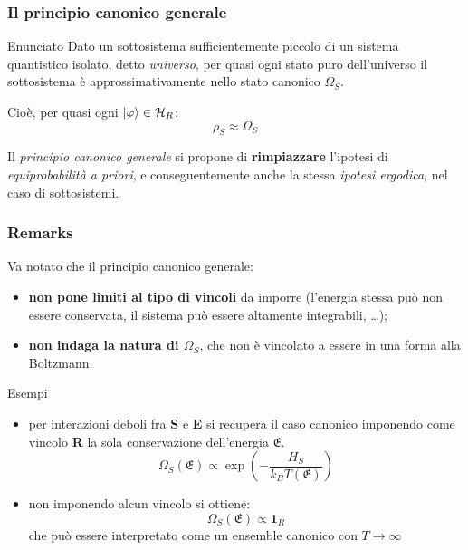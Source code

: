 \documentclass{beamer}
\theoremstyle{definition}
\theoremstyle{plain}
\begin{document}
\begin{frame}
	\frametitle{Il principio canonico generale}
	
	\begin{block}{Enunciato}
		Dato un sottosistema sufficientemente piccolo di un sistema quantistico isolato, detto \textit{universo}, per quasi ogni stato puro dell'universo il sottosistema è approssimativamente nello stato canonico $\Omega_S$.
		\newline
		
		Cioè, per quasi ogni $\ket{\varphi} \in \mathcal{H}_R$:
		\begin{equation*}
			\rho_S \approx \Omega_S
		\end{equation*}
		
	\end{block}

	Il \textit{principio canonico generale} si propone di \textbf{rimpiazzare} l'ipotesi di \textit{equiprobabilità a priori}, e conseguentemente anche la stessa \textit{ipotesi ergodica}, nel caso di sottosistemi.
\end{frame}

\begin{frame}
	\frametitle{Remarks}
	
	Va notato che il principio canonico generale: %
	\begin{itemize}
		\item \textbf{non pone limiti al tipo di vincoli} da imporre (l'energia stessa può non essere conservata, il sistema può essere altamente integrabili, \dots);
		\item \textbf{non indaga la natura di $\Omega_S$}, che non è vincolato a essere in una forma alla Boltzmann.
	\end{itemize}

	\pause
	\begin{exampleblock}{Esempi}
		\begin{itemize}
			\item per interazioni deboli fra \textbf{S} e \textbf{E} si recupera il caso canonico imponendo come vincolo \textbf{R} la sola conservazione dell'energia $\mathfrak{E}$.
			\begin{equation*}
				\Omega_S(\mathfrak{E}) \propto \exp\left( - \frac{H_S}{k_B T(\mathfrak{E})}\right)
			\end{equation*}
			\pause
			\item non imponendo alcun vincolo si ottiene:
			\begin{equation*}
			\Omega_S(\mathfrak{E}) \propto \mathbf{1}_R
			\end{equation*}
			che può essere interpretato come un ensemble canonico con $T \rightarrow \infty$
		\end{itemize}
	\end{exampleblock}
\end{frame}
\end{document}
